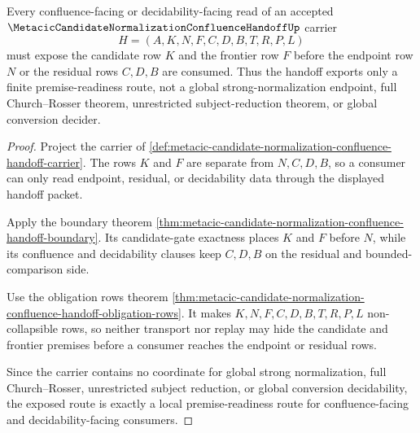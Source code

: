 \begin{theorem}
\label{thm:metacic-candidate-normalization-confluence-handoff-candidate-row-readiness}
Every confluence-facing or decidability-facing read of an accepted $\MetacicCandidateNormalizationConfluenceHandoffUp$ carrier
$$
H=(A,K,N,F,C,D,B,T,R,P,L)
$$
must expose the candidate row $K$ and the frontier row $F$ before the endpoint row $N$ or the residual rows $C,D,B$ are consumed. Thus the handoff exports only a finite premise-readiness route, not a global strong-normalization endpoint, full Church--Rosser theorem, unrestricted subject-reduction theorem, or global conversion decider.
\end{theorem}
\begin{proof}
Project the carrier of \autoref{def:metacic-candidate-normalization-confluence-handoff-carrier}. The rows $K$ and $F$ are separate from $N,C,D,B$, so a consumer can only read endpoint, residual, or decidability data through the displayed handoff packet.

Apply the boundary theorem \autoref{thm:metacic-candidate-normalization-confluence-handoff-boundary}. Its candidate-gate exactness places $K$ and $F$ before $N$, while its confluence and decidability clauses keep $C,D,B$ on the residual and bounded-comparison side.

Use the obligation rows theorem \autoref{thm:metacic-candidate-normalization-confluence-handoff-obligation-rows}. It makes $K,N,F,C,D,B,T,R,P,L$ non-collapsible rows, so neither transport nor replay may hide the candidate and frontier premises before a consumer reaches the endpoint or residual rows.

Since the carrier contains no coordinate for global strong normalization, full Church--Rosser, unrestricted subject reduction, or global conversion decidability, the exposed route is exactly a local premise-readiness route for confluence-facing and decidability-facing consumers.
\end{proof}

